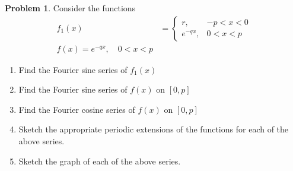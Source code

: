 \documentclass[10pt]{article}
\theoremstyle{definition}
\newtheorem{problem}{Problem}
\begin{document}
\begin{problem}
Consider the functions
\begin{align*}
  f_1(x) & =\begin{cases}
              r,       & -p<x<0 \\
              e^{-qx}, & 0<x<p
            \end{cases} \\
  f(x)=e^{-qx},\quad 0<x<p
\end{align*}
\begin{enumerate}[label=(\alph*)]
  \item Find the Fourier sine series of $f_1(x)$
  \item Find the Fourier sine series of $f(x)$ on $\left[0,p\right]$
  \item Find the Fourier cosine series of $f(x)$ on $\left[0,p\right]$
  \item Sketch the appropriate periodic extensions of the functions for each of the above series.
  \item Sketch the graph of each of the above series.
\end{enumerate}
\end{problem}
\end{document}
